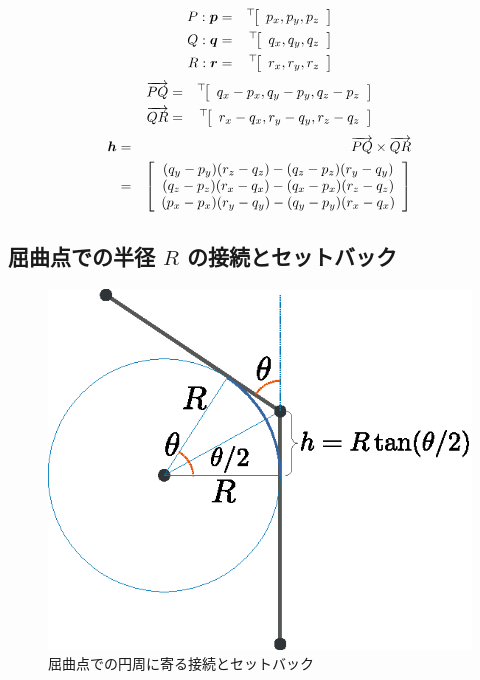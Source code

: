 \documentclass[11pt,a4j]{jarticle}
\begin{document}
  \begin{eqnarray}
    P: {\bm{p}}
      & = &
        {}^{\top}\!{\left[ \begin{array}[c]{c} p_x, p_y, p_z \end{array} \right]}
  \\
    Q: {\bm{q}}
      & = &
        {}^{\top}\!{\left[ \begin{array}[c]{c} q_x, q_y, q_z \end{array} \right]}
  \\
    R: {\bm{r}}
      & = &
        {}^{\top}\!{\left[ \begin{array}[c]{c} r_x, r_y, r_z \end{array} \right]}
  \end{eqnarray}
  \begin{eqnarray}
    {\overrightarrow{PQ}}
      & = &
        {}^{\top}\!{\left[ \begin{array}[c]{c} q_x - p_x, q_y - p_y, q_z - p_z \end{array} \right]}
  \\
    {\overrightarrow{QR}}
      & = &
        {}^{\top}\!{\left[ \begin{array}[c]{c} r_x - q_x, r_y - q_y, r_z - q_z \end{array} \right]}
  \end{eqnarray}
  \begin{eqnarray}
    {\bm{h}}
      & = &
        {\overrightarrow{PQ}} \times {\overrightarrow{QR}}
  \\
      & = &
        \left[ \begin{array}[c]{c} (q_y - p_y)(r_z - q_z) - (q_z - p_z)(r_y - q_y) \\
             (q_z - p_z)(r_x - q_x) - (q_x - p_x)(r_z - q_z) \\
             (p_x - p_x)(r_y - q_y) - (q_y - p_y)(r_x - q_x) \end{array} \right]
  \end{eqnarray}

\subsection{屈曲点での半径 $R$ の接続とセットバック}

\begin{figure}[h]
  \centering
  \includegraphics[width=.6\linewidth]{Fig/figure-04.eps}
  \caption{屈曲点での円周に寄る接続とセットバック}
  \label{fig:Fig/figure-04.eps}
\end{figure}
\end{document}
